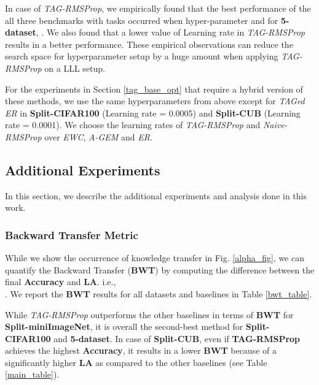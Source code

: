 \documentclass{article} \usepackage{collas2022_conference,times}
\begin{document}
In case of \textit{TAG-RMSProp}, we empirically found that the best performance of the all three benchmarks with  tasks occurred when hyper-parameter  and for \textbf{5-dataset}, . We also found that a lower value of Learning rate in \textit{TAG-RMSProp} results in a better performance. These empirical observations can reduce the search space for hyperparameter setup by a huge amount when applying \textit{TAG-RMSProp} on a LLL setup. 

For the experiments in Section \ref{tag_base_opt} that require a hybrid version of these methods, we use the same hyperparameters from above except for \textit{TAGed ER} in \textbf{Split-CIFAR100} (Learning rate = 0.0005) and \textbf{Split-CUB} (Learning rate = 0.0001). We choose the learning rates of \textit{TAG-RMSProp} and \textit{Naive-RMSProp} over \textit{EWC}, \textit{A-GEM} and \textit{ER}.


\subsection{Additional Experiments}\label{more_exp}
In this section, we describe the additional experiments and analysis done in this work. 

\subsubsection{Backward Transfer Metric}
While we show the occurrence of knowledge transfer in Fig. \ref{alpha_fig}, we can quantify the Backward Transfer (\textbf{BWT}) \citep{chaudhry2019tiny} by computing the difference between the final \textbf{Accuracy} and \textbf{LA}. i.e., \\ . We report the \textbf{BWT} results for all datasets and baselines in Table \ref{bwt_table}. 

While \textit{TAG-RMSProp} outperforms the other baselines in terms of \textbf{BWT} for \textbf{Split-miniImageNet}, it is overall the second-best method for \textbf{Split-CIFAR100} and \textbf{5-dataset}. In case of \textbf{Split-CUB}, even if \textbf{TAG-RMSProp} achieves the highest \textbf{Accuracy}, it results in a lower \textbf{BWT} because of a significantly higher \textbf{LA} as compared to the other baselines (see Table \ref{main_table}). 
\end{document}
